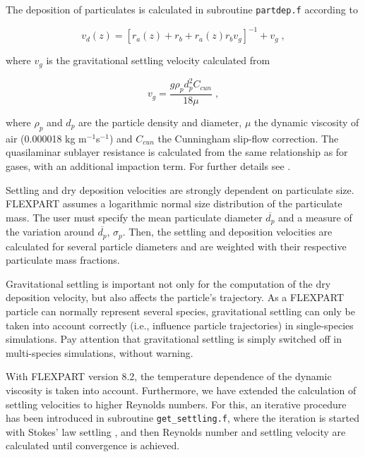 \documentclass{egu}            %
\begin{document}
The deposition of particulates is calculated in subroutine \verb|partdep.f|
according to

\begin{equation}
v_d(z)=\left[r_a(z)+r_b+r_a(z)r_bv_g\right]^{-1}+v_g \;,
\end{equation}

where $v_g$ is the gravitational settling velocity calculated from
\citep{slinn1982}

\begin{equation}
v_g=\frac{g \rho_p d_p^2C_{cun}}{18 \mu} \;,
\end{equation}

where $\rho_p$ and $d_p$ are the particle density and diameter, $\mu$ the
dynamic viscosity of air (0.000018 kg m$^{-1}$s$^{-1}$) and $C_{cun}$ the
Cunningham slip-flow correction.  The quasilaminar sublayer resistance is
calculated from the same relationship as for gases, with an additional
impaction term.  For further details see \citet{slinn1982}.\par

Settling and dry deposition velocities are strongly dependent on particulate
size.  FLEXPART assumes a logarithmic normal size distribution of the
particulate mass.  The user must specify the mean particulate diameter
$\overline{d_p}$ and a measure of the variation around $\overline{d_p}$,
$\sigma_p$.  Then, the settling and deposition velocities are calculated for
several particle diameters and are weighted with their respective particulate
mass fractions.

Gravitational settling is important not only for the computation of the dry
deposition velocity, but also affects the particle's trajectory.  As a FLEXPART
particle can normally represent several species, gravitational settling can
only be taken into account correctly (i.e., influence particle trajectories) in
single-species simulations.  Pay attention that gravitational settling is
simply switched off in multi-species simulations, without warning.

With FLEXPART version 8.2, the temperature dependence of the dynamic viscosity
is taken into account.  Furthermore, we have extended the calculation of
settling velocities to higher Reynolds numbers.  For this, an iterative
procedure has been introduced in subroutine \verb|get_settling.f|, where the
iteration is started with Stokes’ law settling \citep{naeslund1991}, and then
Reynolds number and settling velocity are calculated until convergence is
achieved.
\end{document}
